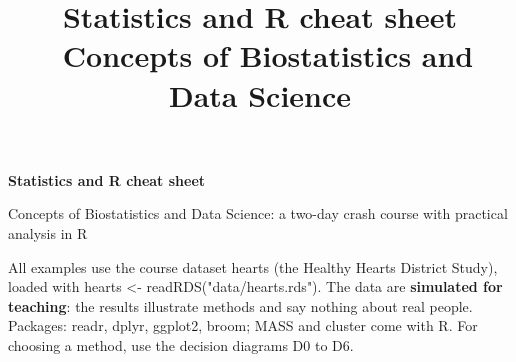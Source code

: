 \documentclass[style1, note, nocover]{neudata}
\title{Statistics and R cheat sheet \textperiodcentered\ Concepts of Biostatistics and Data Science}
\newcommand{\rc}[1]{{\ttfamily\small #1}}
\begin{document}
\small

{\LARGE\bfseries\color{cnavy}Statistics and R cheat sheet}\par
\vspace{2pt}
{\large\color{cblue}Concepts of Biostatistics and Data Science: a two-day crash course with practical analysis in R}\par
\vspace{4pt}
\vspace{4pt}
{\small All examples use the course dataset \rc{hearts} (the Healthy Hearts District Study), loaded with
\rc{hearts <- readRDS("data/hearts.rds")}. The data are \textbf{simulated for teaching}: the results illustrate methods and say nothing about real people. Packages: \rc{readr}, \rc{dplyr}, \rc{ggplot2}, \rc{broom}; \rc{MASS} and \rc{cluster} come with R. For choosing a method, use the decision diagrams D0 to D6.}
\end{document}
